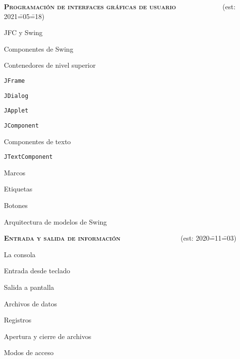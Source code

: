\begin{longenum}
\begin{longenum}
    \end{longenum}
    \item \textbf{\textsc{Programación de interfaces gráficas de usuario}} \ \ \ \ \ \ \ \ \ \ \ \ \ (est: 2021\==05\==18)
    \begin{longenum}
        \item JFC y Swing
        \item Componentes de Swing
        \item Contenedores de nivel superior
        \begin{longenum}
            \item \texttt{JFrame}
            \item \texttt{JDialog}
            \item \texttt{JApplet}
        \end{longenum}
        \item \texttt{JComponent}
        \item Componentes de texto
        \begin{longenum}
            \item \texttt{JTextComponent}
        \end{longenum}
        \item Marcos
        \item Etiquetas
        \item Botones
        \item Arquitectura de modelos de Swing
    \end{longenum}
    \item \textbf{\textsc{Entrada y salida de información}} \ \ \ \ \ \ \ \ \ \ \ \ \ \ \ \ \ (est: 2020\==11\==03)
    \begin{longenum}
        \item La consola
        \begin{longenum}
            \item Entrada desde teclado
            \item Salida a pantalla
        \end{longenum}
        \item Archivos de datos
        \begin{longenum}
            \item Registros
            \item Apertura y cierre de archivos
            \item Modos de acceso

\end{longenum}
\end{longenum}
\end{longenum}
